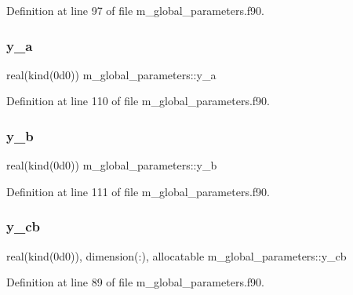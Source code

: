 Definition at line 97 of file m\+\_\+global\+\_\+parameters.\+f90.

\mbox{\label{namespacem__global__parameters_ab19fa915c817b9b6697827d8ce059797}} 
\subsubsection{\texorpdfstring{y\+\_\+a}{y\_a}}
{\footnotesize\ttfamily real(kind(0d0)) m\+\_\+global\+\_\+parameters\+::y\+\_\+a}



Definition at line 110 of file m\+\_\+global\+\_\+parameters.\+f90.

\mbox{\label{namespacem__global__parameters_ae6deea785ef4dbdb572a8eb6f30b7c3a}} 
\subsubsection{\texorpdfstring{y\+\_\+b}{y\_b}}
{\footnotesize\ttfamily real(kind(0d0)) m\+\_\+global\+\_\+parameters\+::y\+\_\+b}



Definition at line 111 of file m\+\_\+global\+\_\+parameters.\+f90.

\mbox{\label{namespacem__global__parameters_aa436c56a050419e85c8c08611a688e63}} 
\subsubsection{\texorpdfstring{y\+\_\+cb}{y\_cb}}
{\footnotesize\ttfamily real(kind(0d0)), dimension(\+:), allocatable m\+\_\+global\+\_\+parameters\+::y\+\_\+cb}



Definition at line 89 of file m\+\_\+global\+\_\+parameters.\+f90.

